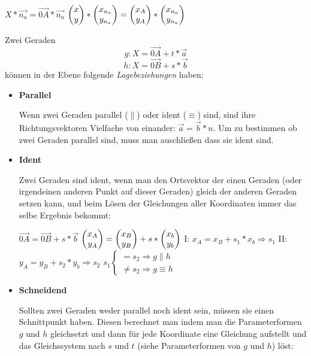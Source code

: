 \begin{center}
  $X * \vec{n_{a}} = \vec{0A} * \vec{n_{a}}$
  \extrapar
  $\begin{pmatrix}x\\y\end{pmatrix} * \begin{pmatrix}x_{n_{a}}\\y_{n_{a}}\end{pmatrix} = \begin{pmatrix}x_{A} \\ y_{A}\end{pmatrix} * \begin{pmatrix}x_{n_{a}}\\y_{n_{a}}\end{pmatrix}$
\end{center}


Zwei Geraden $$g: X = \vec{0A} + t * \vec{a}$$ $$h: X = \vec{0B} + s * \vec{b}$$ k\"{o}nnen in der Ebene folgende \emph{Lagebeziehungen} haben:

\begin{itemize}
  \item \textbf{Parallel}
  \par
  Wenn zwei Geraden parallel ($\parallel$) oder ident ($\equiv$) sind, sind ihre Richtungsvektoren Vielfache von einander: $\vec{a} = \vec{b} * n$. Um zu bestimmen ob zwei Geraden parallel sind, muss man auschlie\ss{}en dass sie ident sind.

\pagebreak

  \item \textbf{Ident}
  \par
  Zwei Geraden sind ident, wenn man den Ortsvektor der einen Geraden (oder irgendeinen anderen Punkt auf dieser Geraden) gleich der anderen Geraden setzen kann, und beim L\"{o}sen der Gleichungen aller Koordinaten immer das selbe Ergebnis bekommt:

  \begin{center}
    $\vec{0A} = \vec{0B} + s * \vec{b}$
    \extrapar
    $\begin{pmatrix}x_{A}\\y_{A}\end{pmatrix} = \begin{pmatrix}x_{B}\\y_{B}\end{pmatrix} + s * \begin{pmatrix}x_{b}\\y_{b}\end{pmatrix}$
    \extrapar
    I: $x_{A} = x_{B} + s_{1} * x_{b} \Rightarrow s_{1}$
    \extrapar
    II: $y_{A} = y_{B} + s_{2} * y_{b} \Rightarrow s_{2}$
    \extrapar
    $
      s_{1}
      \begin{cases}
        = s_{2} \Rightarrow g \parallel h\\
        \neq s_{2} \Rightarrow g \equiv h
      \end{cases}
    $
  \end{center}

\item \textbf{Schneidend}
  \par
  Sollten zwei Geraden weder parallel noch ident sein, m\"{u}ssen sie einen Schnittpunkt haben. Diesen berechnet man indem man die Parameterformen $g$ und $h$ gleichsetzt und dann f\"{u}r jede Koordinate eine Gleichung aufstellt und das Gleichssystem nach $s$ und $t$ (siehe Parameterformen von $g$ und $h$) l\"{o}st:


\end{itemize}
